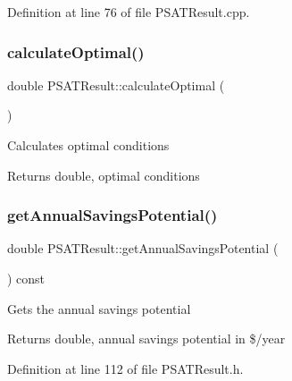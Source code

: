 Definition at line 76 of file P\+S\+A\+T\+Result.\+cpp.

\mbox{\label{class_p_s_a_t_result_a25d50cd89b326f18449496a56d54f472}} 
\subsubsection{\texorpdfstring{calculate\+Optimal()}{calculateOptimal()}\hspace{0.1cm}{\footnotesize\ttfamily [3/3]}}
{\footnotesize\ttfamily double P\+S\+A\+T\+Result\+::calculate\+Optimal (\begin{DoxyParamCaption}{ }\end{DoxyParamCaption})}

Calculates optimal conditions \begin{DoxyReturn}{Returns}
double, optimal conditions 
\end{DoxyReturn}
\mbox{\label{class_p_s_a_t_result_a14fc75c2e0e92f74e3df1b97ed13b496}} 
\subsubsection{\texorpdfstring{get\+Annual\+Savings\+Potential()}{getAnnualSavingsPotential()}\hspace{0.1cm}{\footnotesize\ttfamily [1/3]}}
{\footnotesize\ttfamily double P\+S\+A\+T\+Result\+::get\+Annual\+Savings\+Potential (\begin{DoxyParamCaption}{ }\end{DoxyParamCaption}) const\hspace{0.3cm}{\ttfamily [inline]}}

Gets the annual savings potential

\begin{DoxyReturn}{Returns}
double, annual savings potential in \$/year 
\end{DoxyReturn}


Definition at line 112 of file P\+S\+A\+T\+Result.\+h.

\mbox{\label{class_p_s_a_t_result_a14fc75c2e0e92f74e3df1b97ed13b496}} 
